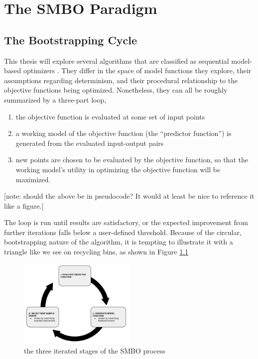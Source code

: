 \chapter{The SMBO Paradigm}\label{ch:smbo}

\section{The Bootstrapping Cycle}

This thesis will explore several algorithms that are classified as sequential model-based optimizers \cite{hutter_sequential_2011, hamadi_autonomous_2012, jones_efficient_1998, rasmussen_gaussian_2006}. %
They differ in the space of model functions they explore, their assumptions regarding determinism, and their procedural relationship to the objective functions being optimized. %
Nonetheless, they can all be roughly summarized by a three-part loop,

\begin{enumerate} \label{smbo_loop}
\item the objective function is evaluated at some set of input points
\item a working model of the objective function (the ``predictor function'') is generated from the evaluated input-output pairs
\item new points are chosen to be evaluated by the objective function, so that the working model's utility in optimizing the objective function will be maximized.
\end{enumerate}

[note: should the above be in pseudocode? It would at least be nice to reference it like a figure.]

The loop is run until results are satisfactory, or the expected improvement from further iterations falls below a user-defined threshold. Because of the circular, bootstrapping nature of the algorithm, it is tempting to illustrate it with a triangle like we see on recycling bins, as shown in Figure \ref{fig:smbo_cycle}

\begin{figure}[h]
	\centering
	\includegraphics[width=0.5\textwidth]{EGO_cycle}
	\caption{the three iterated stages of the SMBO process}
	\label{fig:smbo_cycle}

\end{figure}

